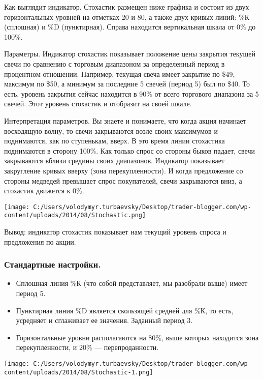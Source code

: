 \documentclass[a5paper]{article}
\begin{document}
Как выглядит индикатор. Стохастик размещен ниже графика и состоит из двух горизонтальных уровней на отметках 20 и 80, а также двух кривых линий: \%К (сплошная) и \%D (пунктирная). Справа находится вертикальная шкала от 0\% до 100\%.

Параметры. Индикатор стохастик показывает положение цены закрытия текущей свечи по сравнению с торговым диапазоном за определенный период в процентном отношении. Например, текущая свеча имеет закрытие по \$49, максимум по \$50, а минимум за последние 5 свечей (период 5) был по \$40. То есть, уровень закрытия сейчас находится в 90\% от всего торгового диапазона за 5 свечей. Этот уровень стохастик и отобразит на своей шкале.

Интерпретация параметров. Вы знаете и понимаете, что когда акция
начинает восходящую волну, то свечи закрываются возле своих максимумов
и поднимаются, как по ступенькам, вверх. В это время линии стохастика
поднимаются в сторону 100\%. Как только спрос со стороны быков падает,
свечи закрываются вблизи средины своих диапазонов. Индикатор
показывает закругление кривых вверху (зона перекупленности). И когда
предложение со стороны медведей превышает спрос покупателей, свечи
закрываются вниз, а стохастик движется к 0\%.

\texttt{[image: C:/Users/volodymyr.turbaevsky/Desktop/trader-blogger.com/wp-content/uploads/2014/08/Stochastic.png]}

Вывод: индикатор стохастик показывает нам текущий уровень спроса и предложения по акции.

\subsubsection{Стандартные настройки.}
\begin{itemize}
\item     Сплошная линия \%К (что собой представляет, мы разобрали выше) имеет период 5.
\item     Пунктирная линия \%D является скользящей средней для \%К, то есть, усредняет и сглаживает ее значения. Заданный период 3.
\item     Горизонтальные уровни располагаются на 80\%, выше которых находится
                                зона перекупленности, и 20\% —
                                перепроданности.
\end{itemize}

\texttt{[image: C:/Users/volodymyr.turbaevsky/Desktop/trader-blogger.com/wp-content/uploads/2014/08/Stochastic-1.png]}
\end{document}
